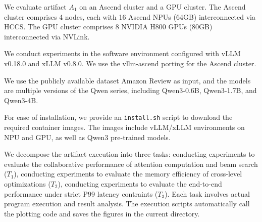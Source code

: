 \documentclass[conference]{IEEEtran}
\begin{document}
\artin


We evaluate artifact $A_1$ on an Ascend cluster and a GPU cluster. The Ascend cluster comprises 4 nodes, each with 16 Ascend NPUs (64GB) interconnected via HCCS. The GPU cluster comprises 8 NVIDIA H800 GPUs (80GB) interconnected via NVLink.




We conduct experiments in the software environment configured with vLLM v0.18.0 and xLLM v0.8.0. We use the vllm-ascend porting for the Ascend cluster. 




We use the publicly available dataset Amazon Review as input, and the models are multiple versions of the Qwen series, including Qwen3-0.6B, Qwen3-1.7B, and Qwen3-4B.




For ease of installation, we provide an \texttt{install.sh} script to download the required container images. The images include vLLM/xLLM environments on NPU and GPU, as well as Qwen3 pre-trained models.




\artcomp

We decompose the artifact execution into three tasks: conducting experiments to evaluate the collaborative performance of attention computation and beam search ($T_1$), conducting experiments to evaluate the memory efficiency of cross-level optimizations ($T_2$), conducting experiments to evaluate the end-to-end performance under strict P99 latency contraints ($T_3$). Each task involves actual program execution and result analysis. The execution scripts automatically call the plotting code and saves the figures in the current directory.
\end{document}

